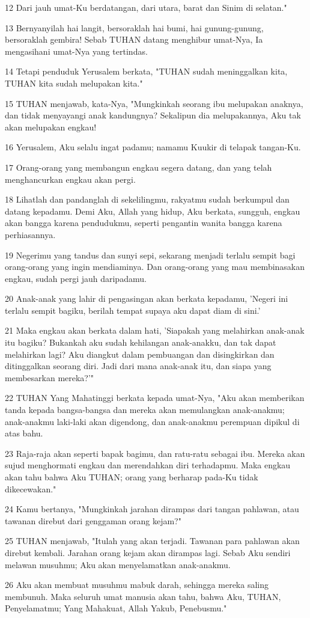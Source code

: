 \par 12 Dari jauh umat-Ku berdatangan, dari utara, barat dan Sinim di selatan."
\par 13 Bernyanyilah hai langit, bersoraklah hai bumi, hai gunung-gunung, bersoraklah gembira! Sebab TUHAN datang menghibur umat-Nya, Ia mengasihani umat-Nya yang tertindas.
\par 14 Tetapi penduduk Yerusalem berkata, "TUHAN sudah meninggalkan kita, TUHAN kita sudah melupakan kita."
\par 15 TUHAN menjawab, kata-Nya, "Mungkinkah seorang ibu melupakan anaknya, dan tidak menyayangi anak kandungnya? Sekalipun dia melupakannya, Aku tak akan melupakan engkau!
\par 16 Yerusalem, Aku selalu ingat padamu; namamu Kuukir di telapak tangan-Ku.
\par 17 Orang-orang yang membangun engkau segera datang, dan yang telah menghancurkan engkau akan pergi.
\par 18 Lihatlah dan pandanglah di sekelilingmu, rakyatmu sudah berkumpul dan datang kepadamu. Demi Aku, Allah yang hidup, Aku berkata, sungguh, engkau akan bangga karena pendudukmu, seperti pengantin wanita bangga karena perhiasannya.
\par 19 Negerimu yang tandus dan sunyi sepi, sekarang menjadi terlalu sempit bagi orang-orang yang ingin mendiaminya. Dan orang-orang yang mau membinasakan engkau, sudah pergi jauh daripadamu.
\par 20 Anak-anak yang lahir di pengasingan akan berkata kepadamu, 'Negeri ini terlalu sempit bagiku, berilah tempat supaya aku dapat diam di sini.'
\par 21 Maka engkau akan berkata dalam hati, 'Siapakah yang melahirkan anak-anak itu bagiku? Bukankah aku sudah kehilangan anak-anakku, dan tak dapat melahirkan lagi? Aku diangkut dalam pembuangan dan disingkirkan dan ditinggalkan seorang diri. Jadi dari mana anak-anak itu, dan siapa yang membesarkan mereka?'"
\par 22 TUHAN Yang Mahatinggi berkata kepada umat-Nya, "Aku akan memberikan tanda kepada bangsa-bangsa dan mereka akan memulangkan anak-anakmu; anak-anakmu laki-laki akan digendong, dan anak-anakmu perempuan dipikul di atas bahu.
\par 23 Raja-raja akan seperti bapak bagimu, dan ratu-ratu sebagai ibu. Mereka akan sujud menghormati engkau dan merendahkan diri terhadapmu. Maka engkau akan tahu bahwa Aku TUHAN; orang yang berharap pada-Ku tidak dikecewakan."
\par 24 Kamu bertanya, "Mungkinkah jarahan dirampas dari tangan pahlawan, atau tawanan direbut dari genggaman orang kejam?"
\par 25 TUHAN menjawab, "Itulah yang akan terjadi. Tawanan para pahlawan akan direbut kembali. Jarahan orang kejam akan dirampas lagi. Sebab Aku sendiri melawan musuhmu; Aku akan menyelamatkan anak-anakmu.
\par 26 Aku akan membuat musuhmu mabuk darah, sehingga mereka saling membunuh. Maka seluruh umat manusia akan tahu, bahwa Aku, TUHAN, Penyelamatmu; Yang Mahakuat, Allah Yakub, Penebusmu."

